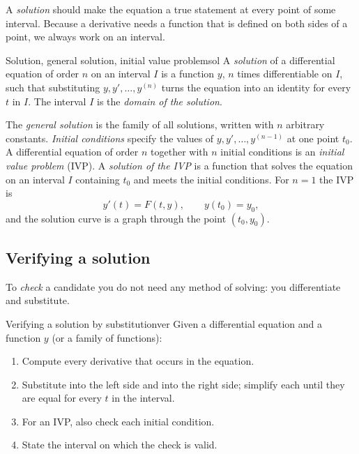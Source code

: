 \documentclass[11pt]{article}
\begin{document}
A \emph{solution} should make the equation a true statement at every point of some interval. Because a derivative needs a function that is defined on both sides of a point, we always work on an interval.

\begin{defn}{Solution, general solution, initial value problem}{sol}
A \emph{solution} of a differential equation of order $n$ on an interval $I$ is a function $y$, $n$ times differentiable on $I$, such that substituting $y,y',\dots,y^{(n)}$ turns the equation into an identity for every $t$ in $I$. The interval $I$ is the \emph{domain of the solution}.

The \emph{general solution} is the family of all solutions, written with $n$ arbitrary constants. \emph{Initial conditions} specify the values of $y,y',\dots,y^{(n-1)}$ at one point $t_0$. A differential equation of order $n$ together with $n$ initial conditions is an \emph{initial value problem} (IVP). A \emph{solution of the IVP} is a function that solves the equation on an interval $I$ containing $t_0$ and meets the initial conditions. For $n=1$ the IVP is
\[
y'(t)=F(t,y),\qquad y(t_0)=y_0,
\]
and the solution curve is a graph through the point $(t_0,y_0)$.
\end{defn}

\subsection*{Verifying a solution}

To \emph{check} a candidate you do not need any method of solving: you differentiate and substitute.

\begin{proc}{Verifying a solution by substitution}{ver}
Given a differential equation and a function $y$ (or a family of functions):
\begin{enumerate}[nosep]
  \item Compute every derivative that occurs in the equation.
  \item Substitute into the left side and into the right side; simplify each until they are equal for every $t$ in the interval.
  \item For an IVP, also check each initial condition.
  \item State the interval on which the check is valid.
\end{enumerate}
\end{proc}
\end{document}
